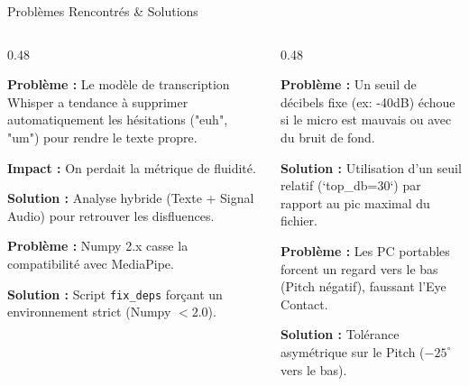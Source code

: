 \documentclass[10pt,aspectratio=169]{beamer}
\begin{document}
\begin{frame}{Problèmes Rencontrés & Solutions}
    \begin{columns}[T]
        \begin{column}{0.48\textwidth}
            \begin{tcolorbox}[colframe=warning, title=Whisper "trop" intelligent]
                \footnotesize
                \textbf{Problème :} Le modèle de transcription Whisper a tendance à supprimer automatiquement les hésitations ("euh", "um") pour rendre le texte propre.
                
                \textbf{Impact :} On perdait la métrique de fluidité.
                
                \textbf{Solution :} Analyse hybride (Texte + Signal Audio) pour retrouver les disfluences.
            \end{tcolorbox}
            \vspace{0.1cm}
            \begin{tcolorbox}[colframe=danger, title=Conflits de Dépendances]
                \footnotesize
                \textbf{Problème :} Numpy 2.x casse la compatibilité avec MediaPipe.
                
                \textbf{Solution :} Script \texttt{fix\_deps} forçant un environnement strict (Numpy $<2.0$).
            \end{tcolorbox}
        \end{column}
        \begin{column}{0.48\textwidth}
            \begin{tcolorbox}[colframe=danger, title=Seuils de Silence]
                \footnotesize
                \textbf{Problème :} Un seuil de décibels fixe (ex: -40dB) échoue si le micro est mauvais ou avec du bruit de fond.
                
                \textbf{Solution :} Utilisation d'un seuil relatif (`top_db=30`) par rapport au pic maximal du fichier.
            \end{tcolorbox}
            \vspace{0.1cm}
            \begin{tcolorbox}[colframe=accent, title=Regard \& Angle Webcam]
                \footnotesize
                \textbf{Problème :} Les PC portables forcent un regard vers le bas (Pitch négatif), faussant l'Eye Contact.
                
                \textbf{Solution :} Tolérance asymétrique sur le Pitch ($-25^\circ$ vers le bas).
            \end{tcolorbox}
        \end{column}
    \end{columns}
\end{frame}
\end{document}

